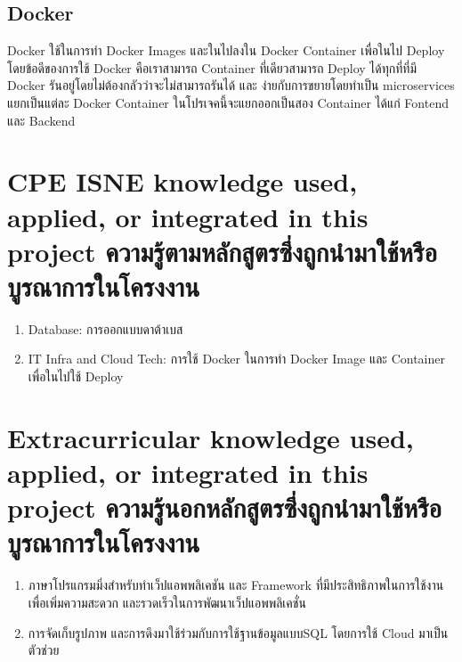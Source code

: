 \subsection{Docker}
Docker ใช้ในการทำ Docker Images และในไปลงใน Docker Container เพื่อในไป Deploy โดยข้อดีของการใช้ Docker คือเราสามารถ  Container ที่เดียวสามารถ Deploy ได้ทุกที่ที่มี Docker รันอยู่โดยไม่ต้องกลัวว่าจะไม่สามารถรันได้
และ ง่ายกับการขยายโดยทำเป็น microservices แยกเป็นแต่ละ Docker Container ในโปรเจคนี้จะแยกออกเป็นสอง Container ได้แก่  Fontend และ Backend 

\section{\ifenglish%
\ifcpe CPE \else ISNE \fi knowledge used, applied, or integrated in this project
\else%
ความรู้ตามหลักสูตรซึ่งถูกนำมาใช้หรือบูรณาการในโครงงาน
\fi
}

\begin{enumerate}
    \item Database: การออกแบบดาต้าเบส
    \item IT Infra and Cloud Tech: การใช้ Docker ในการทำ Docker Image และ Container เพื่อในไปใช้ Deploy
\end{enumerate}

\section{\ifenglish%
Extracurricular knowledge used, applied, or integrated in this project
\else%
ความรู้นอกหลักสูตรซึ่งถูกนำมาใช้หรือบูรณาการในโครงงาน
\fi
}

\begin{enumerate}
    \item ภาษาโปรแกรมมิ่งสำหรับทำเว็ปแอพพลิเคชัน และ Framework ที่มีประสิทธิภาพในการใช้งานเพื่อเพิ่มความสะดวก และรวดเร็วในการพัฒนาเว็ปแอพพลิเคชั่น
    \item การจัดเก็บรูปภาพ และการดึงมาใช้ร่วมกับการใช้ฐานข้อมูลแบบSQL โดยการใช้ Cloud มาเป็นตัวช่วย
\end{enumerate}

